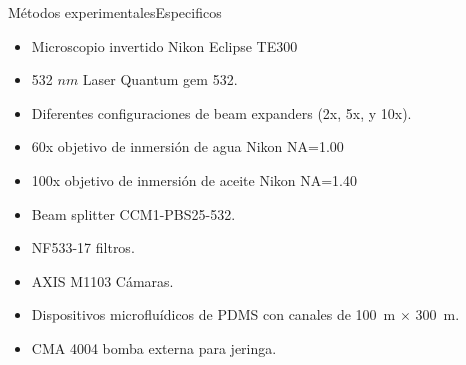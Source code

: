 \documentclass[10pt,aspectratio=1610,compress,dvipsnames]{beamer}
\begin{document}
\begin{frame}{Métodos experimentales}{Especificos}
\begin{itemize}
	\item Microscopio invertido Nikon Eclipse TE300
	\item 532 $nm$ Laser Quantum gem 532.
	\item Diferentes configuraciones de beam expanders (2x, 5x, y 10x).
	\item 60x objetivo de inmersi\'on de agua Nikon NA=1.00
	\item 100x objetivo de inmersi\'on de aceite Nikon NA=1.40
	\item Beam splitter CCM1-PBS25-532.
	\item NF533-17 filtros.
	\item AXIS M1103 C\'amaras.
	\item {Dispositivos microflu\'idicos de PDMS con canales de 100~\textmu m $\times$ 300~\textmu m.}
	\item CMA 4004 bomba externa para jeringa.
	

\end{itemize}
\end{frame}
\end{document}
